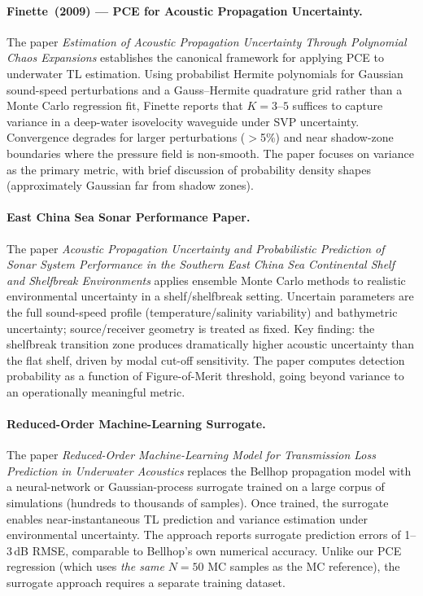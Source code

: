 \documentclass[11pt,a4paper]{article}
\begin{document}
\paragraph{Finette~(2009) — PCE for Acoustic Propagation Uncertainty.}
The paper \emph{Estimation of Acoustic Propagation Uncertainty Through Polynomial
Chaos Expansions} establishes the canonical framework for applying PCE to
underwater TL estimation.
Using probabilist Hermite polynomials for Gaussian sound-speed perturbations
and a Gauss–Hermite quadrature grid rather than a Monte Carlo regression fit,
Finette reports that $K = 3$--$5$ suffices to capture variance in a deep-water
isovelocity waveguide under SVP uncertainty.
Convergence degrades for larger perturbations ($>$5\%) and near shadow-zone
boundaries where the pressure field is non-smooth.
The paper focuses on variance as the primary metric, with brief discussion of
probability density shapes (approximately Gaussian far from shadow zones).

\paragraph{East China Sea Sonar Performance Paper.}
The paper \emph{Acoustic Propagation Uncertainty and Probabilistic Prediction of
Sonar System Performance in the Southern East China Sea Continental Shelf and
Shelfbreak Environments} applies ensemble Monte Carlo methods to realistic
environmental uncertainty in a shelf/shelfbreak setting.
Uncertain parameters are the full sound-speed profile (temperature/salinity
variability) and bathymetric uncertainty; source/receiver geometry is treated
as fixed.
Key finding: the shelfbreak transition zone produces dramatically higher acoustic
uncertainty than the flat shelf, driven by modal cut-off sensitivity.
The paper computes detection probability as a function of Figure-of-Merit threshold,
going beyond variance to an operationally meaningful metric.

\paragraph{Reduced-Order Machine-Learning Surrogate.}
The paper \emph{Reduced-Order Machine-Learning Model for Transmission Loss
Prediction in Underwater Acoustics} replaces the Bellhop propagation model with
a neural-network or Gaussian-process surrogate trained on a large corpus of
simulations (hundreds to thousands of samples).
Once trained, the surrogate enables near-instantaneous TL prediction and variance
estimation under environmental uncertainty.
The approach reports surrogate prediction errors of 1--3\,dB RMSE, comparable to
Bellhop's own numerical accuracy.
Unlike our PCE regression (which uses \emph{the same} $N=50$ MC samples as the
MC reference), the surrogate approach requires a separate training dataset.
\end{document}
